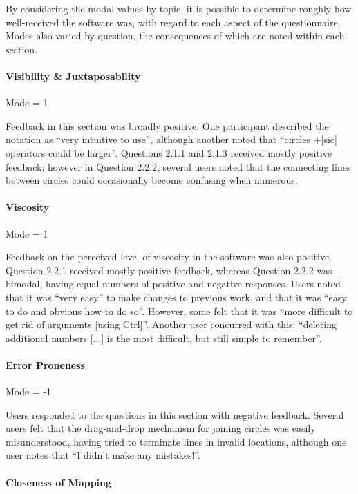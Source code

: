 \documentclass[12pt,twoside,notitlepage,xetex]{report}
\begin{document}
By considering the modal values by topic, it is possible to determine roughly how well-received the software was, with regard to each aspect of the questionnaire.  Modes also varied by question, the consequences of which are noted within each section.

\paragraph{Visibility \& Juxtaposability}\hfill

Mode = 1

Feedback in this section was broadly positive.  One participant described the notation as ``very intuitive to use'', although another noted that ``circles +[sic] operators could be larger''.  Questions 2.1.1 and 2.1.3 received mostly positive feedback; however in Question 2.2.2, several users noted that the connecting lines between circles could occasionally become confusing when numerous.

\paragraph{Viscosity}\hfill

Mode = 1

Feedback on the perceived level of viscosity in the software was also positive. Question 2.2.1 received mostly positive feedback, whereas Question 2.2.2 was bimodal, having equal numbers of positive and negative responses.  Users noted that it was ``very easy'' to make changes to previous work, and that it was ``easy to do and obvious how to do so''.  However, some felt that it was ``more difficult to get rid of arguments [using Ctrl]''.  Another user concurred with this: ``deleting additional numbers [...] is the most difficult, but still simple to remember''.

\paragraph{Error Proneness}\hfill

Mode = -1

Users responded to the questions in this section with negative feedback.  Several users felt that the drag-and-drop mechanism for joining circles was easily misunderstood, having tried to terminate lines in invalid locations, although one user notes that ``I didn't make any mistakes!''.

\paragraph{Closeness of Mapping}\hfill
\end{document}
